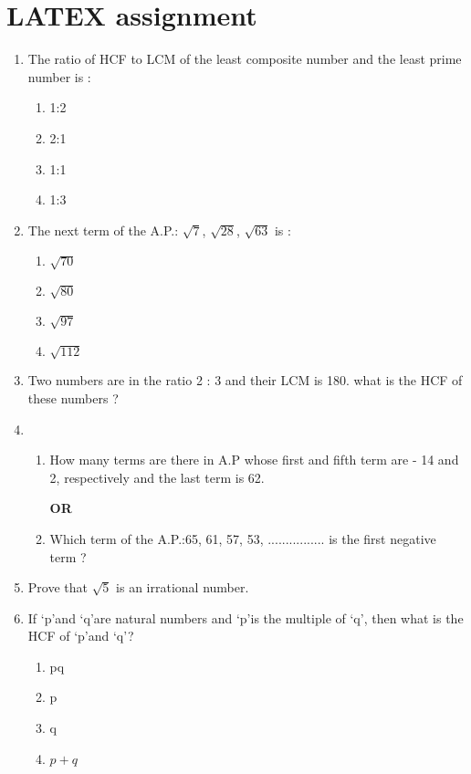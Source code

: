 \documentclass[12pt]{article}
\begin{document}
\section*{\center LATEX assignment}
\begin{enumerate}
    \item  The ratio of HCF to LCM of the least composite number and the least prime number is :
    \begin{enumerate}[label=(\alph*)]
      \item 1:2
      \item 2:1
      \item 1:1
      \item 1:3
    \end{enumerate}
    \item The next term of the A.P.: $\sqrt{7}$, $\sqrt{28}$, $\sqrt{63}$ is :
    \begin{enumerate}[label=(\alph*)]
      \item $\sqrt{70}$
      \item $\sqrt{80}$
      \item $\sqrt{97}$
      \item $\sqrt{112}$
    \end{enumerate}
    \item Two numbers are in the ratio 2 : 3 and their LCM is 180. what is the HCF of these numbers ?
    \item \begin{enumerate}[label=(\Alph*)]
    \item How many terms are there in A.P whose first and fifth term are - 14 and 2, respectively and the last term is 62.
\begin{center}
   \textbf{OR}
\end{center}
\item Which term of the A.P.:65, 61, 57, 53, ................ is the first negative term ?
    \end{enumerate}
    \item Prove that $\sqrt{5}$ is an irrational number.
    \item If \lq p\rq and \lq q\rq are natural numbers and \lq p\rq is the multiple of \lq q\rq, then what is the HCF of \lq p\rq and \lq q\rq ?
    \begin{enumerate}[label=(\alph*)]
      \item pq
      \item p
      \item q
      \item $p+q$
      \end{enumerate}

\end{enumerate}
\end{document}
